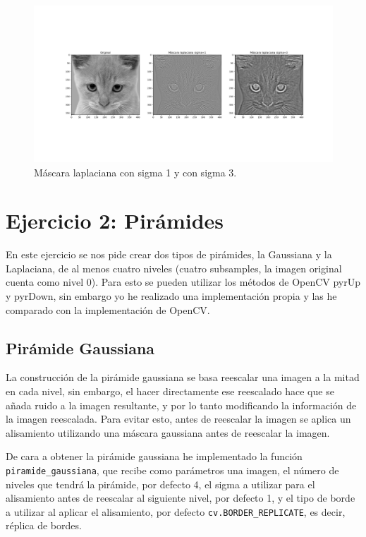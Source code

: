 \documentclass[12pt, spanish]{article}
\begin{document}
\begin{figure}[H]
  \centering
      \includegraphics[width=\textwidth]{ej1d.png}
 		 \caption{Máscara laplaciana con sigma 1 y con sigma 3.}
  		\label{fig:ej1d}

\end{figure}



\section{Ejercicio 2: Pirámides}

En este ejercicio se nos pide crear dos tipos de pirámides, la Gaussiana y la Laplaciana, de al menos cuatro niveles (cuatro subsamples, la imagen original cuenta como nivel 0). Para esto se pueden utilizar los métodos de OpenCV pyrUp y pyrDown, sin embargo yo he realizado una implementación propia y las he comparado con la implementación de OpenCV.

\subsection{Pirámide Gaussiana}

La construcción de la pirámide gaussiana se basa reescalar una imagen a la mitad en cada nivel, sin embargo, el hacer directamente ese reescalado hace que se añada ruido a la imagen resultante, y por lo tanto modificando la información de la imagen reescalada. Para evitar esto, antes de reescalar la imagen se aplica un alisamiento utilizando una máscara gaussiana antes de reescalar la imagen.

De cara a obtener la pirámide gaussiana he implementado la función \texttt{piramide\_gaussiana}, que recibe como parámetros una imagen, el número de niveles que tendrá la pirámide, por defecto 4, el sigma a utilizar para el alisamiento antes de reescalar al siguiente nivel, por defecto 1, y el tipo de borde a utilizar al aplicar el alisamiento, por defecto \texttt{cv.BORDER\_REPLICATE}, es decir, réplica de bordes.
\end{document}
